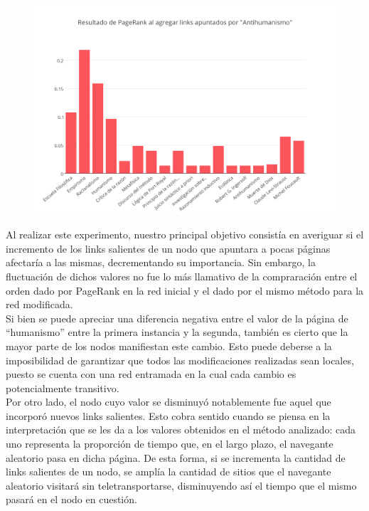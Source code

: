 \documentclass[a4paper]{article}
\begin{document}
\begin{figure}[h!]
  \begin{center}
	\includegraphics[scale=0.80]{imagenes/Exp3/after}
	\caption{}
	\label{after3}
  \end{center}
\end{figure}
\newpage


\indent Al realizar este experimento, nuestro principal objetivo consistía en averiguar si el incremento de los links salientes de un nodo que apuntara a pocas páginas afectaría a las mismas, decrementando su importancia. Sin embargo, la fluctuación de dichos valores no fue lo más llamativo de la compraración entre el orden dado por PageRank en la red inicial y el dado por el mismo método para la red modificada. \\
\indent Si bien se puede apreciar una diferencia negativa entre el valor de la página de ``humanismo'' entre la primera instancia y la segunda, también es cierto que la mayor parte de los nodos manifiestan este cambio. Esto puede deberse a la imposibilidad de garantizar que todos las modificaciones realizadas sean locales, puesto se cuenta con una red entramada en la cual cada cambio es potencialmente transitivo. \\
\indent Por otro lado, el nodo cuyo valor se disminuyó notablemente fue aquel que incorporó nuevos links salientes. Esto cobra sentido cuando se piensa en la interpretación que se les da a los valores obtenidos en el método analizado: cada uno representa la proporción de tiempo que, en el largo plazo, el navegante aleatorio pasa en dicha página. De esta forma, si se incrementa la cantidad de links salientes de un nodo, se amplía la cantidad de sitios que el navegante aleatorio visitará sin teletransportarse, disminuyendo así el tiempo que el mismo pasará en el nodo en cuestión.
\end{document}
